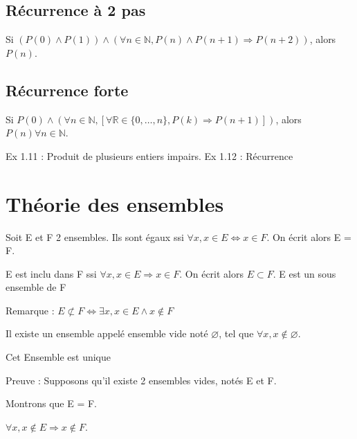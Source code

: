 \documentclass[french]{yLectureNote}
\begin{document}
\subsection{Récurrence à 2 pas}
\begin{theorem}[Déf]
Si $(P(0)\wedge P(1)) \wedge (\forall n \in \mathbb{N}, P(n) \wedge P(n+1) \Rightarrow P(n+2))$, alors $P(n)$.
\end{theorem}
\subsection{Récurrence forte}
\begin{theorem}[définition]
Si $P(0) \wedge (\forall n \in \mathbb{N}, [\forall \mathbb{R} \in \{0,\dots,n\}, P(k) \Rightarrow P(n+1)])$, alors $P(n) \forall n \in \mathbb{N}$.
\end{theorem}
Ex 1.11 : Produit de plusieurs entiers impairs.
Ex 1.12 : Récurrence
\section{Théorie des ensembles}
\begin{theorem}
Soit E et F 2 ensembles. Ils sont égaux ssi $\forall x, x \in E \iff x \in F$. On écrit alors E = F.
\end{theorem}

\begin{theorem}[Inclusion]
E est inclu dans F ssi $\forall x, x \in E \Rightarrow x \in F$. On écrit alors $E \subset F$. E est un sous ensemble de F
\end{theorem}



Remarque : $E \not\subset F \iff \exists x, x \in E \wedge x \notin F$

\begin{axiom}[Axiome]
Il existe un ensemble appelé ensemble vide  noté $\varnothing$, tel que $\forall x, x \notin \varnothing$.
\end{axiom}

\begin{axiom}
Cet Ensemble est unique
\end{axiom}
Preuve : Supposons qu'il existe 2 ensembles vides, notés E et F.

Montrons que E = F.

$\forall x, x\notin E \Rightarrow x \notin F$.
\end{document}
